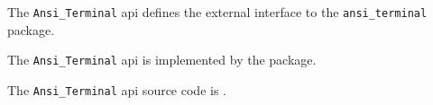 
The {\tt Ansi\_Terminal} api defines the external interface to the {\tt ansi\_terminal} package.

The {\tt Ansi\_Terminal} api is implemented by the  package.

The {\tt Ansi\_Terminal} api source code is .

